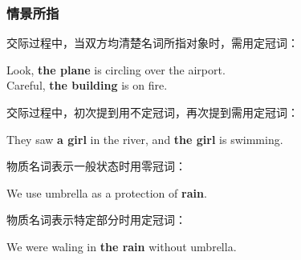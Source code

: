 \documentclass[UTF8]{ctexart}
\begin{document}
\subsubsection{情景所指}
    交际过程中，当双方均清楚名词所指对象时，需用定冠词：
    \begin{center}
        \large\ttfamily
        Look, \textbf{the plane} is circling over the airport.\\[2mm]
        Careful, \textbf{the building} is on fire.\\[4mm]
    \end{center}
    交际过程中，初次提到用不定冠词，再次提到需用定冠词：
    \begin{center}
        \large\ttfamily
        They saw \textbf{a girl} in the river, and \textbf{the girl} is swimming.\\[4mm]
    \end{center}
    物质名词表示一般状态时用零冠词：
    \begin{center}
        \large\ttfamily
        We use umbrella as a protection of \textbf{rain}.\\[4mm]
    \end{center}
    物质名词表示特定部分时用定冠词：
    \begin{center}
        \large\ttfamily
        We were waling in \textbf{the rain} without umbrella.
    \end{center}
\newpage
\end{document}
